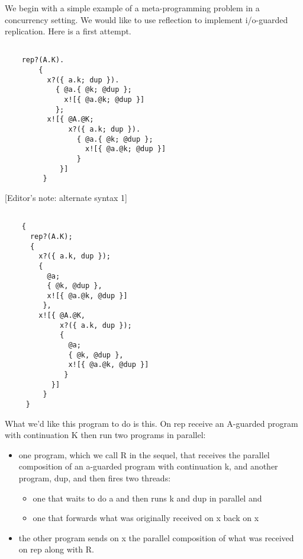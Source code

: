 We begin with a simple example of a meta-programming problem in a
concurrency setting. We would like to use reflection to implement
i/o-guarded replication. Here is a first attempt.

\begin{verbatim}

    rep?(A.K).
        {                                       
          x?({ a.k; dup }).
            { @a.{ @k; @dup }; 
              x![{ @a.@k; @dup }] 
            };
          x![{ @A.@K; 
               x?({ a.k; dup }).
                 { @a.{ @k; @dup }; 
                   x![{ @a.@k; @dup }] 
                 }
             }]
         }

\end{verbatim}

[Editor's note: alternate syntax 1]

\begin{verbatim}

    {
      rep?(A.K);
      {                                       
        x?({ a.k, dup });
        { 
          @a;
          { @k, @dup },
          x![{ @a.@k, @dup }] 
         },
        x![{ @A.@K, 
             x?({ a.k, dup });
             { 
               @a;
               { @k, @dup },
               x![{ @a.@k, @dup }] 
              }
           }]
         }
     }

\end{verbatim}

What we'd like this program to do is this. On \textsf{rep} receive an
\textsf{A}-guarded program with continuation \textsf{K} then run two
programs in parallel:
\begin{itemize}
\item one program, which we call R in the sequel, that receives the
  parallel composition of an \textsf{a}-guarded program with
  continuation \textsf{k}, and another program, \textsf{dup}, and then
  fires two threads:
  \begin{itemize}
  \item one that waits to do \textsf{a} and then runs \textsf{k} and
    \textsf{dup} in parallel and
  \item one that forwards what was originally received on \textsf{x}
    back on \textsf{x}
  \end{itemize}
\item the other program sends on x the parallel composition of what was
  received on \textsf{rep} along with R.
\end{itemize}


